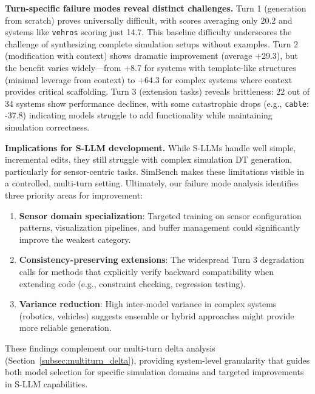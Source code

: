 \documentclass{ieeeaccess}
\begin{document}
\textbf{Turn-specific failure modes reveal distinct challenges.}
Turn 1 (generation from scratch) proves universally difficult, with scores averaging only 20.2 and systems like \texttt{vehros} scoring just 14.7. This baseline difficulty underscores the challenge of synthesizing complete simulation setups without examples. Turn 2 (modification with context) shows dramatic improvement (average +29.3), but the benefit varies widely—from +8.7 for systems with template-like structures (minimal leverage from context) to +64.3 for complex systems where context provides critical scaffolding. Turn 3 (extension tasks) reveals brittleness: 22 out of 34 systems show performance declines, with some catastrophic drops (e.g., \texttt{cable}: -37.8) indicating models struggle to add functionality while maintaining simulation correctness.

\textbf{Implications for S-LLM development.}
While S-LLMs handle well simple, incremental edits, they still struggle with complex simulation DT generation, particularly for sensor-centric tasks. SimBench makes these limitations visible in a controlled, multi-turn setting. Ultimately, our failure mode analysis identifies three priority areas for improvement:

\begin{enumerate}
    \item \textbf{Sensor domain specialization}: Targeted training on sensor configuration patterns, visualization pipelines, and buffer management could significantly improve the weakest category.
    \item \textbf{Consistency-preserving extensions}: The widespread Turn 3 degradation calls for methods that explicitly verify backward compatibility when extending code (e.g., constraint checking, regression testing).
    \item \textbf{Variance reduction}: High inter-model variance in complex systems (robotics, vehicles) suggests ensemble or hybrid approaches might provide more reliable generation.
\end{enumerate}

These findings complement our multi-turn delta analysis (Section~\ref{subsec:multiturn_delta}), providing system-level granularity that guides both model selection for specific simulation domains and targeted improvements in S-LLM capabilities.
\end{document}
